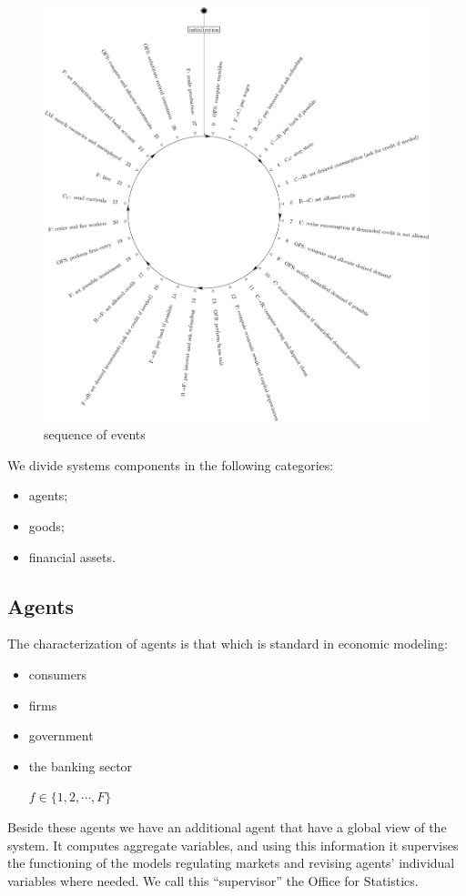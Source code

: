 \documentclass{article}
\begin{document}
\begin{figure}[htp]
	\centering
\includegraphics[scale=0.5]{visual.pdf}
	\caption{sequence of events}
	\label{fig:sequence}
\end{figure}

\newpage
We divide systems components in the following categories:
\begin{itemize}
	\item agents;
	\item goods;
	\item financial assets.
\end{itemize}
\subsection{Agents}
The characterization of agents is that which is standard in economic modeling:
\begin{itemize}
	\item consumers
	\item firms
	\item government
	\item the banking sector

		$f\in \{1, 2, \cdots, F\}$

\end{itemize}
Beside these agents we have an additional agent that have a global view of the system. It computes aggregate variables, and using this information it supervises the functioning of the models regulating markets and revising agents' individual variables where needed. We call this ``supervisor'' the Office for Statistics.
\end{document}
